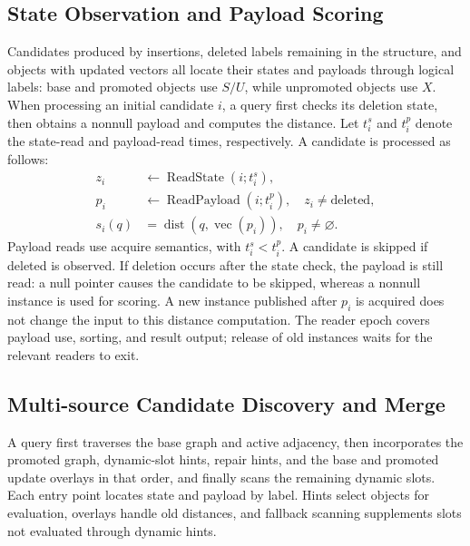 \documentclass[sigconf,pbalance]{acmart}
\begin{document}
\subsection{State Observation and Payload Scoring}
\label{sec:authoritative-resolution}

Candidates produced by insertions, deleted labels remaining in the structure, and objects with updated vectors all locate their states and payloads through logical labels: base and promoted objects use $S/U$, while unpromoted objects use $X$. When processing an initial candidate $i$, a query first checks its deletion state, then obtains a nonnull payload and computes the distance. Let $t_i^s$ and $t_i^p$ denote the state-read and payload-read times, respectively. A candidate is processed as follows:
\begin{equation}
\label{eq:resolve}
\begin{aligned}
 z_i&\gets\operatorname{ReadState}(i;t_i^s),\\
 p_i&\gets\operatorname{ReadPayload}(i;t_i^p),\quad z_i\ne\mathrm{deleted},\\
 s_i(q)&=\operatorname{dist}(q,\operatorname{vec}(p_i)),\quad p_i\ne\varnothing.
\end{aligned}
\end{equation}
Payload reads use acquire semantics, with $t_i^s<t_i^p$. A candidate is skipped if deleted is observed. If deletion occurs after the state check, the payload is still read: a null pointer causes the candidate to be skipped, whereas a nonnull instance is used for scoring. A new instance published after $p_i$ is acquired does not change the input to this distance computation. The reader epoch covers payload use, sorting, and result output; release of old instances waits for the relevant readers to exit.

\subsection{Multi-source Candidate Discovery and Merge}
\label{sec:multi-source}

A query first traverses the base graph and active adjacency, then incorporates the promoted graph, dynamic-slot hints, repair hints, and the base and promoted update overlays in that order, and finally scans the remaining dynamic slots. Each entry point locates state and payload by label. Hints select objects for evaluation, overlays handle old distances, and fallback scanning supplements slots not evaluated through dynamic hints.
\end{document}
